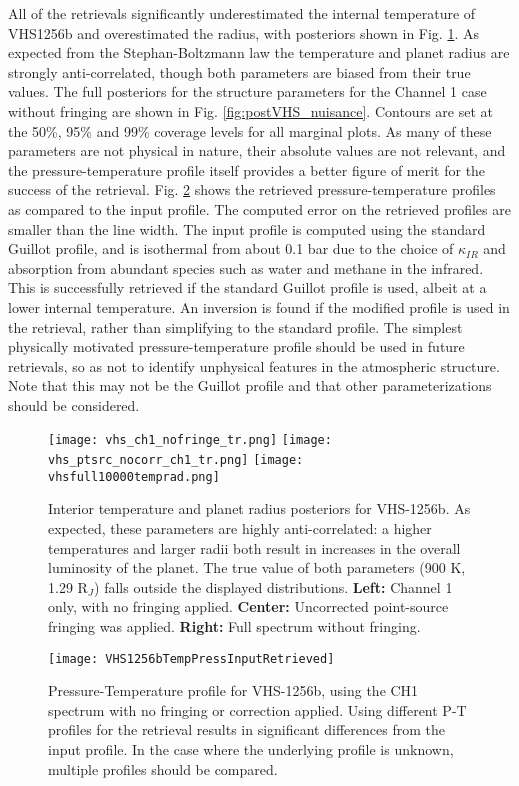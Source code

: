 All of the retrievals significantly underestimated the internal temperature of VHS1256b and overestimated the radius, with posteriors shown in Fig. \ref{fig:postVHS_tr}.
As expected from the Stephan-Boltzmann law the temperature and planet radius are strongly anti-correlated, though both parameters are biased from their true values.
The full posteriors for the structure parameters for the Channel 1 case without fringing are shown in Fig. \ref{fig:postVHS_nuisance}.
Contours are set at the 50\%, 95\% and 99\% coverage levels for all marginal plots.
As many of these parameters are not physical in nature, their absolute values are not relevant, and the pressure-temperature profile itself provides a better figure of merit for the success of the retrieval.
Fig. \ref{fig:presVHS} shows the retrieved pressure-temperature profiles as compared to the input profile. 
The computed error on the retrieved profiles are smaller than the line width.
The input profile is computed using the standard Guillot profile, and is isothermal from about 0.1 bar due to the choice of $\kappa_{IR}$ and absorption from abundant species such as water and methane in the infrared.
This is successfully retrieved if the standard Guillot profile is used, albeit at a lower internal temperature.
An inversion is found if the modified profile is used in the retrieval, rather than simplifying to the standard profile.
The simplest physically motivated pressure-temperature profile should be used in future retrievals, so as not to identify unphysical features in the atmospheric structure.
Note that this may not be the Guillot profile and that other parameterizations should be considered.

\begin{figure}[t]
	\centering
	\texttt{[image: vhs\_ch1\_nofringe\_tr.png]}
	\texttt{[image: vhs\_ptsrc\_nocorr\_ch1\_tr.png]}
	\texttt{[image: vhsfull10000temprad.png]}
	\caption{Interior temperature and planet radius posteriors for VHS-1256b.
		As expected, these parameters are highly anti-correlated: a higher temperatures and larger radii both result in increases in the overall luminosity of the planet. The true value of both parameters (900 K, 1.29 R$_{J}$) falls outside the displayed distributions.
		\textbf{Left:} Channel 1 only, with no fringing applied. 
		\textbf{Center:} Uncorrected point-source fringing was applied. 
		\textbf{Right:} Full spectrum without fringing. }
	\label{fig:postVHS_tr}
\end{figure}
\begin{figure}
	\centering
	\texttt{[image: VHS1256bTempPressInputRetrieved]}
	\caption{Pressure-Temperature profile for VHS-1256b, using the CH1 spectrum with no fringing or correction applied. Using different P-T profiles for the retrieval results in significant differences from the input profile. In the case where the underlying profile is unknown, multiple profiles should be compared.}
	\label{fig:presVHS}
\end{figure}

